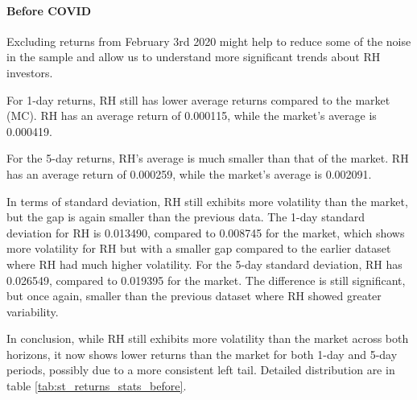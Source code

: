 \paragraph{Before COVID}
Excluding returns from February 3rd 2020 might help to reduce some of the noise in the sample and allow us to understand more significant trends about RH investors.

For 1-day returns, RH still has lower average returns compared to the market (MC). 
RH has an average return of 0.000115, while the market's average is 0.000419.

For the 5-day returns, RH's average is much smaller than that of the market. 
RH has an average return of 0.000259, while the market's average is 0.002091. 

In terms of standard deviation, RH still exhibits more volatility than the market, but the gap is again smaller than the previous data.
The 1-day standard deviation for RH is 0.013490, compared to 0.008745 for the market, which shows more volatility for RH but with a smaller gap compared to the earlier dataset where RH had much higher volatility.
For the 5-day standard deviation, RH has 0.026549, compared to 0.019395 for the market. The difference is still significant, but once again, smaller than the previous dataset where RH showed greater variability.

In conclusion, while RH still exhibits more volatility than the market across both horizons, it now shows lower returns than the market for both 1-day and 5-day periods, possibly due to a more consistent left tail.
Detailed distribution are in table \ref{tab:st_returns_stats_before}.

